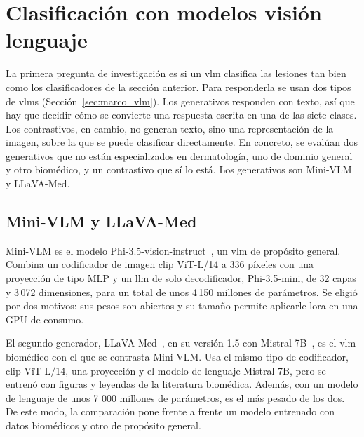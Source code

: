 \section{Clasificación con modelos visión--lenguaje}
\label{sec:met_clasif_vlm}

La primera pregunta de investigación es si un \gls{vlm} clasifica las lesiones tan bien como los clasificadores de
la sección anterior. Para responderla se usan dos tipos de \glspl{vlm} (Sección~\ref{sec:marco_vlm}). Los generativos
responden con texto, así que hay que decidir cómo se convierte una respuesta escrita en una de las siete clases. Los
contrastivos, en cambio, no generan texto, sino una representación de la imagen, sobre la que se puede clasificar directamente.
En concreto, se evalúan dos generativos que no están especializados en dermatología, uno de dominio general y otro biomédico, y
un contrastivo que sí lo está. Los generativos son Mini-VLM y LLaVA-Med.

\subsection{Mini-VLM y LLaVA-Med}
\label{sec:met_vlm_generativos}

Mini-VLM es el modelo Phi-3.5-vision-instruct~\cite{abdin2024phi3}, un \gls{vlm} de propósito general. Combina un
codificador de imagen \gls{clip} ViT-L/14 a 336 píxeles con una proyección de tipo MLP y un \gls{llm} de solo
decodificador, Phi-3.5-mini, de 32 capas y 3\,072 dimensiones, para un total de unos 4\,150 millones de parámetros.
Se eligió por dos motivos: sus pesos son abiertos y su tamaño permite aplicarle \gls{lora} en una GPU de consumo.

El segundo generador, LLaVA-Med~\cite{li2023llavamed}, en su versión 1.5 con Mistral-7B~\cite{zeng2025mmskin}, es el \gls{vlm} biomédico con el que se contrasta
Mini-VLM. Usa el mismo tipo de codificador, \gls{clip} ViT-L/14, una proyección y el modelo de lenguaje
Mistral-7B, pero se entrenó con figuras y leyendas de la literatura biomédica. Además, con un modelo de lenguaje de unos 7 000
millones de parámetros, es el más pesado de los dos. De este modo, la comparación pone frente a frente un modelo
entrenado con datos biomédicos y otro de propósito general.

